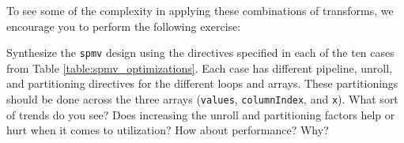 



To see some of the complexity in applying these combinations of transforms, we encourage you to perform the following exercise:

\begin{exercise}
Synthesize the \lstinline{spmv} design using the directives specified in each of the ten cases from Table \ref{table:spmv_optimizations}. Each case has different pipeline, unroll, and partitioning directives for the different loops and arrays. These partitionings should be done across the three arrays (\lstinline{values}, \lstinline{columnIndex}, and \lstinline{x}). What sort of trends do you see? Does increasing the unroll and partitioning factors help or hurt when it comes to utilization? How about performance? Why?
\end{exercise}

